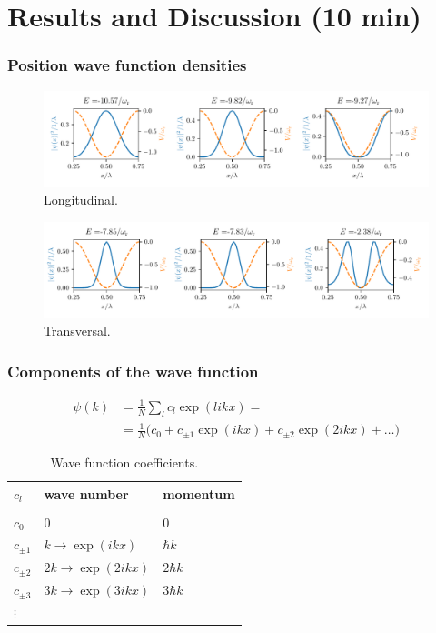 \documentclass[pdflatex,compress]{beamer}
\begin{document}
\section{Results and Discussion (10 min)}


\begin{frame}
\frametitle{Position wave function densities}
\vspace{-1em}
\begin{figure}
\centering
\includegraphics[width=1\textwidth]{images/dens_long.pdf}
\vspace*{-7mm}
\caption{Longitudinal.}
\end{figure}
\vspace{-1em}
\begin{figure}
\centering
\includegraphics[width=1\textwidth]{images/dens_trans.pdf}
\vspace*{-7mm}
\caption{Transversal.}
\end{figure}
\end{frame}

\begin{frame}
\frametitle{Components of the wave function}
\vspace{-3em}
\begin{align}
\psi(k) & = \frac{1}{N} \sum_l c_l \exp(likx) =  \\
& = \frac{1}{N} \Big( c_0 + c_{\pm 1} \exp(ikx) + c_{\pm 2} \exp(2ikx) + \dots \Big) \nonumber
\end{align}
\vspace{-1em}
\begin{table}[!htb]
\centering
\begin{tabular}{lll}
$c_l$    & wave number & momentum    \\
\hline \\
$c_0$    & 0           & 0           \\
$c_{\pm 1}$ & $k \rightarrow \exp(ikx)$         & $\hbar k$   \\
$c_{\pm 2}$ & $2k \rightarrow \exp(2ikx)$        & $2 \hbar k$ \\
$c_{\pm 3}$ & $3k \rightarrow \exp(3ikx)$        & $3 \hbar k$ \\
$\vdots$ &             &            
\end{tabular}
\caption{Wave function coefficients.}
\end{table}
\end{frame}
\end{document}
